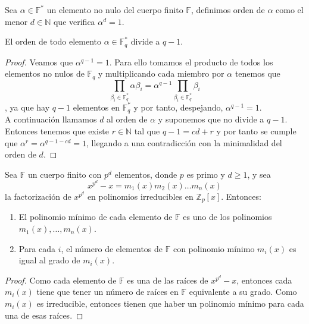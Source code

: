 \begin{definicion}
		Sea $\alpha \in \mathbb{F}^*$ un elemento no nulo del cuerpo finito $\mathbb{F}$, definimos orden de $\alpha$ como el menor $d\in \mathbb{N}$ que verifica $\alpha^d=1$.
\end{definicion}

\begin{teorema}
	El orden de todo elemento $\alpha \in \mathbb{F}^*_q$ divide a $q-1$. 
\end{teorema}
\begin{proof}
		Veamos que $\alpha^{q-1}=1$. Para ello tomamos el producto de todos los elementos no nulos de $\mathbb{F}_q$ y multiplicando cada miembro por $\alpha$ tenemos que \[ \prod_{\beta_i \in \mathbb{F}^*_q}\alpha\beta_i=\alpha^{q-1}\prod_{\beta_i \in \mathbb{F}^*_q}\beta_i\],
		ya que hay $q-1$ elementos en $\mathbb{F}^*_q$ y por tanto, despejando, $\alpha^{q-1}=1$.\\
		A continuación llamamos $d$ al orden de $\alpha$ y suponemos que no divide a $q-1$. Entonces tenemos que existe $r\in\mathbb{N}$ tal que $q-1=cd+r$ y por tanto se cumple que $\alpha^r=\alpha^{q-1-cd}=1$, llegando a una contradicción con la minimalidad del orden de $d$.
\end{proof}

\begin{proposicion}
	Sea $\mathbb{F}$ un cuerpo finito con $p^d$ elementos, donde $p$ es primo y $d\geq 1$, y sea
	$$
		x^{p^d}-x=m_1(x)m_2(x)\dots m_n(x)
	$$
	la factorización  de $x^{p^d}$ en polinomios irreducibles en $\mathbb{Z}_p[x]$. Entonces:
	\begin{enumerate}
		\item El polinomio mínimo de cada elemento de $\mathbb{F}$ es uno de los polinomios $m_1(x),\dots,m_n(x)$.
		\item Para cada $i$, el número de elementos de $\mathbb{F}$ con polinomio mínimo $m_i(x)$ es igual al grado de $m_i(x)$.
	\end{enumerate}
\end{proposicion}

\begin{proof}
		Como cada elemento de $\mathbb{F}$ es una de las raíces de $x^{p^d}-x$, entonces cada $m_i(x)$ tiene que tener un número de raíces en $\mathbb{F}$ equivalente a su grado. Como $m_i(x)$ es irreducible, entonces tienen que haber un polinomio mínimo para cada una de esas raíces.
\end{proof}

